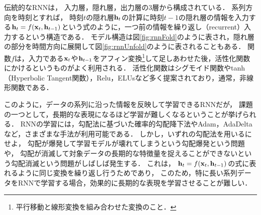\begin{figure}[t]
\begin{center}
\hspace*{-40pt}
\end{center}
\end{figure}

伝統的なRNNは，
入力層，隠れ層，出力層の3層から構成されている．
系列方向を時刻とすれば，
時刻$t$の隠れ層${\bf h}_t$の計算に時刻$t-1$の隠れ層の情報を入力する${\bf h}_t = f({\bf x}_t, {\bf h}_{t-1})$という式のように，一つ前の情報を繰り返し（recurrent）入力するという構造である．
モデル構造は図\ref{fig:rnnFold}のように表され，隠れ層の部分を時間方向に展開して図\ref{fig:rnnUnfold}のように表されることもある．
関数$f$は，入力である${\bf x}_t$や${\bf h}_{t-1}$をアフィン変換\footnote{平行移動と線形変換を組み合わせた変換のこと．}して足しあわせた後，活性化関数にかけるというものがよく利用される．
活性化関数はシグモイド関数やtanh（Hyperbolic Tangent関数），Relu\cite{nair2010rectified}，ELUs\cite{clevert2015fast}など多く提案されており，通常，非線形関数である．



このように，データの系列に沿った情報を反映して学習できるRNNだが，
課題の一つとして，長期的な表現になるほど学習が難しくなるということが挙げられる\cite{bengio1994learning}．
RNNの学習には，勾配法に基づいた確率的勾配降下法\cite{robbins1951stochastic,kushner2003stochastic}やAdam\cite{kingma2014adam}，AdaDelta\cite{zeiler2012adadelta}など，さまざまな手法が利用可能である．
しかし，いずれの勾配法を用いるにせよ，
勾配が爆発して学習モデルが壊れてしまうという勾配爆発\cite{bengio1994learning,pascanu2013difficulty}という問題や，
勾配が消滅して対象データの長期的な特徴量を捉えることができないという勾配消滅\cite{pascanu2013difficulty, hochreiter1998vanishing}という問題がしばしば発生する．
これは，
${\bf h}_t = f({\bf x}_t, {\bf h}_{t-1})$の式に表れるように同じ変換を繰り返し行うためであり，
このため，特に長い系列データをRNNで学習する場合，効果的に長期的な表現を学習させることが難しい．


